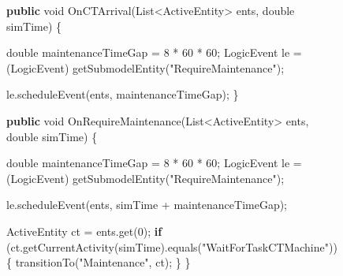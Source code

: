 \documentclass[
  10pt,
  a4paperpaper,
  DIV=11,
  numbers=noendperiod,
  oneside]{scrreprt}
\newenvironment{Shaded}{\begin{snugshade}}{\end{snugshade}}
\newcommand{\BuiltInTok}[1]{\textcolor[rgb]{0.00,0.23,0.31}{#1}}
\newcommand{\ControlFlowTok}[1]{\textcolor[rgb]{0.00,0.23,0.31}{\textbf{#1}}}
\newcommand{\DataTypeTok}[1]{\textcolor[rgb]{0.68,0.00,0.00}{#1}}
\newcommand{\DecValTok}[1]{\textcolor[rgb]{0.68,0.00,0.00}{#1}}
\newcommand{\FunctionTok}[1]{\textcolor[rgb]{0.28,0.35,0.67}{#1}}
\newcommand{\KeywordTok}[1]{\textcolor[rgb]{0.00,0.23,0.31}{\textbf{#1}}}
\newcommand{\NormalTok}[1]{\textcolor[rgb]{0.00,0.23,0.31}{#1}}
\newcommand{\OperatorTok}[1]{\textcolor[rgb]{0.37,0.37,0.37}{#1}}
\newcommand{\StringTok}[1]{\textcolor[rgb]{0.13,0.47,0.30}{#1}}
\begin{document}
\begin{figure}

\begin{codebox}

\begin{Shaded}
\begin{Highlighting}[numbers=left,,]
\KeywordTok{public} \DataTypeTok{void} \FunctionTok{OnCTArrival}\OperatorTok{(}\BuiltInTok{List}\OperatorTok{\textless{}}\NormalTok{ActiveEntity}\OperatorTok{\textgreater{}}\NormalTok{ ents}\OperatorTok{,} \DataTypeTok{double}\NormalTok{ simTime}\OperatorTok{)} \OperatorTok{\{}
        
  \DataTypeTok{double}\NormalTok{ maintenanceTimeGap }\OperatorTok{=} \DecValTok{8} \OperatorTok{*} \DecValTok{60} \OperatorTok{*} \DecValTok{60}\OperatorTok{;}
\NormalTok{  LogicEvent le }\OperatorTok{=} \OperatorTok{(}\NormalTok{LogicEvent}\OperatorTok{)} \FunctionTok{getSubmodelEntity}\OperatorTok{(}\StringTok{"RequireMaintenance"}\OperatorTok{);}
  
\NormalTok{  le}\OperatorTok{.}\FunctionTok{scheduleEvent}\OperatorTok{(}\NormalTok{ents}\OperatorTok{,}\NormalTok{ maintenanceTimeGap}\OperatorTok{);}
\OperatorTok{\}}
  
\KeywordTok{public} \DataTypeTok{void} \FunctionTok{OnRequireMaintenance}\OperatorTok{(}\BuiltInTok{List}\OperatorTok{\textless{}}\NormalTok{ActiveEntity}\OperatorTok{\textgreater{}}\NormalTok{ ents}\OperatorTok{,} \DataTypeTok{double}\NormalTok{ simTime}\OperatorTok{)} \OperatorTok{\{}
      
  \DataTypeTok{double}\NormalTok{ maintenanceTimeGap }\OperatorTok{=} \DecValTok{8} \OperatorTok{*} \DecValTok{60} \OperatorTok{*} \DecValTok{60}\OperatorTok{;}
\NormalTok{  LogicEvent le }\OperatorTok{=} \OperatorTok{(}\NormalTok{LogicEvent}\OperatorTok{)} \FunctionTok{getSubmodelEntity}\OperatorTok{(}\StringTok{"RequireMaintenance"}\OperatorTok{);}
  
\NormalTok{  le}\OperatorTok{.}\FunctionTok{scheduleEvent}\OperatorTok{(}\NormalTok{ents}\OperatorTok{,}\NormalTok{ simTime }\OperatorTok{+}\NormalTok{ maintenanceTimeGap}\OperatorTok{);}
  
\NormalTok{  ActiveEntity ct }\OperatorTok{=}\NormalTok{ ents}\OperatorTok{.}\FunctionTok{get}\OperatorTok{(}\DecValTok{0}\OperatorTok{);}
  \ControlFlowTok{if} \OperatorTok{(}\NormalTok{ct}\OperatorTok{.}\FunctionTok{getCurrentActivity}\OperatorTok{(}\NormalTok{simTime}\OperatorTok{).}\FunctionTok{equals}\OperatorTok{(}\StringTok{"WaitForTaskCTMachine"}\OperatorTok{))} \OperatorTok{\{}
    \FunctionTok{transitionTo}\OperatorTok{(}\StringTok{"Maintenance"}\OperatorTok{,}\NormalTok{ ct}\OperatorTok{);}
  \OperatorTok{\}}      
\OperatorTok{\}}
\end{Highlighting}
\end{Shaded}

\end{codebox}

\end{figure}%
\end{document}
